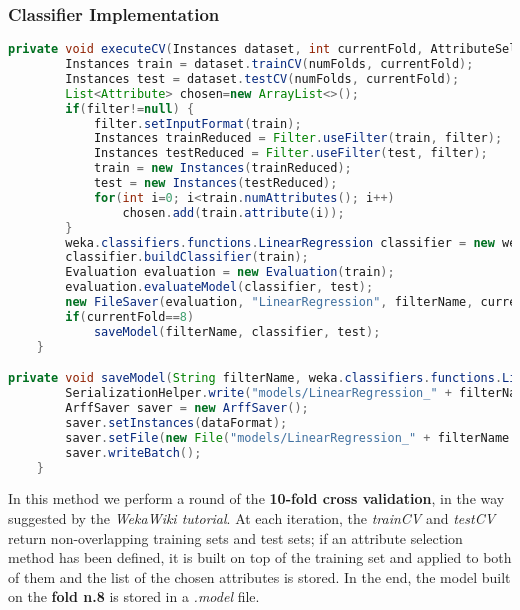 \subsubsection{Classifier Implementation}
\begin{lstlisting}[language=Java]
private void executeCV(Instances dataset, int currentFold, AttributeSelection filter, String filterName) throws Exception {
        Instances train = dataset.trainCV(numFolds, currentFold);
        Instances test = dataset.testCV(numFolds, currentFold);
        List<Attribute> chosen=new ArrayList<>();
        if(filter!=null) {
            filter.setInputFormat(train);
            Instances trainReduced = Filter.useFilter(train, filter);
            Instances testReduced = Filter.useFilter(test, filter);
            train = new Instances(trainReduced);
            test = new Instances(testReduced);
            for(int i=0; i<train.numAttributes(); i++)
                chosen.add(train.attribute(i));
        }
        weka.classifiers.functions.LinearRegression classifier = new weka.classifiers.functions.LinearRegression();
        classifier.buildClassifier(train);
        Evaluation evaluation = new Evaluation(train);
        evaluation.evaluateModel(classifier, test);
        new FileSaver(evaluation, "LinearRegression", filterName, currentFold, chosen).save();
        if(currentFold==8)
            saveModel(filterName, classifier, test);
    }

private void saveModel(String filterName, weka.classifiers.functions.LinearRegression classifier, Instances dataFormat) throws Exception{
        SerializationHelper.write("models/LinearRegression_" + filterName + ".model", classifier);
        ArffSaver saver = new ArffSaver();
        saver.setInstances(dataFormat);
        saver.setFile(new File("models/LinearRegression_" + filterName + "_data.arff"));
        saver.writeBatch();
    }
\end{lstlisting}

In this method we perform a round of the \textbf{10-fold cross validation}, in the way suggested by the \textit{WekaWiki tutorial}. At each iteration, the \textit{trainCV} and \textit{testCV} return non-overlapping training sets and test sets; if an attribute selection method has been defined, it is built on top of the training set and applied to both of them and the list of the chosen attributes is stored. In the end, the model built on the \textbf{fold n.8} is stored in a \textit{.model} file. 




